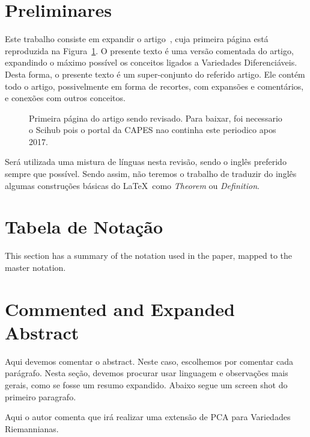\documentclass[a4paper,titlepage]{article}
\begin{document}


\section{Preliminares}

Este trabalho consiste em expandir o artigo~\cite{Pennec:AnnStat:2018},
cuja primeira página está reproduzida na Figura~\ref{fig:paper:page1}.
O presente texto é uma versão comentada do artigo,
expandindo o máximo possível os conceitos ligados a Variedades Diferenciáveis.
Desta forma, o presente texto é um super-conjunto do referido artigo.
Ele contém todo o artigo, possivelmente em forma de recortes, com expansões e
comentários, e conexões com outros conceitos.

\begin{figure}
\centering
{}
\caption{%
Primeira página do artigo sendo revisado. Para baixar, foi necessario o Scihub
pois o portal da CAPES nao continha este periodico apos 2017.
}\label{fig:paper:page1}
\end{figure}

Será utilizada uma mistura de línguas nesta revisão, sendo o inglês preferido
sempre que possível. Sendo assim, não teremos o trabalho de traduzir do inglês
algumas construções básicas do \LaTeX\ como \emph{Theorem} ou
\emph{Definition}.


\section{Tabela de Notação}

This section has a summary of the notation used in the paper, 
mapped to the master notation.

\section{Commented and Expanded Abstract}

Aqui devemos comentar o abstract. Neste caso, escolhemos por comentar
cada parágrafo. Nesta seção, devemos procurar usar linguagem e observações mais
gerais, como se fosse um resumo expandido. Abaixo segue um screen shot do primeiro paragrafo.

{
\vspace{1em}
\vspace{1em}
}

Aqui o autor comenta que irá realizar uma extensão de PCA para Variedades
Riemannianas.
\end{document}
